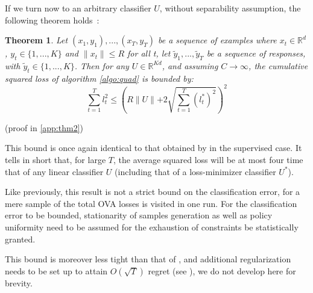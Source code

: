 \documentclass[preprint,12pt,authoryear]{elsarticle}
\newtheorem{theorem}{Theorem}
\begin{document}
\vspace{.5cm} 
If we turn now to an arbitrary classifier $U$, without separability assumption, the following theorem holds~:

\begin{theorem}
	\label{theo:BPAT2}
	Let $(x_1,y_1),...,(x_T,y_T)$ be a sequence of examples where $x_t \in \mathbb{R}^d$, $y_t\in \{1,...,K\}$ and $\parallel x_t \parallel\leqslant R$ for all t, let $\tilde{y}_1,...,\tilde{y}_T$ be a sequence of responses, with $\tilde{y}_t\in \{1,...,K\}$. Then for any  $U \in \mathbb{R}^{K d}$, and assuming $C \rightarrow \infty$, the cumulative squared loss of algorithm \ref{algo:quad} is bounded by:
	\[\sum_{t=1}^{T}l_t^2 \leqslant \left(R\parallel{U}\parallel+2 \sqrt{\sum_{t=1}^{T}(l_t^{\ast})^2}\right)^2 \]
\end{theorem}

(proof in \ref{app:thm2})

This bound is once again identical to that obtained by 
\cite{crammer2006online} in the supervised case. 
It tells in short that, for large $T$, the average squared 
loss will be at most four time that of any linear 
classifier $U$ (including that of a loss-minimizer classifier $U^*$). 

Like previously, this result is not a strict bound on the classification error, for a mere sample of the total OVA losses is visited in one run. For the classification error to be bounded, stationarity of samples generation as well as policy uniformity need to be assumed for the exhaustion of constraints be statistically granted.  

This bound is moreover less tight than that of \cite{freund1997decision}, and  additional regularization needs to be set up to attain $O(\sqrt{T})$ regret (see \cite{crammer2006online}),  
we do not develop here for brevity. 



\end{document}
